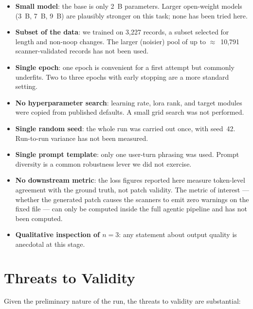 \documentclass[12pt, a4paper]{report}
\begin{document}
\begin{itemize}
  \item \textbf{Small model}: the base is only 2~B parameters. Larger
        open-weight models (3~B, 7~B, 9~B) are plausibly stronger on
        this task; none has been tried here.
  \item \textbf{Subset of the data}: we trained on 3{,}227 records, a
        subset selected for length and non-noop changes. The larger
        (noisier) pool of up to \(\approx\)~10{,}791 scanner-validated
        records has not been used.
  \item \textbf{Single epoch}: one epoch is convenient for a first
        attempt but commonly underfits. Two to three epochs with early
        stopping are a more standard setting.
  \item \textbf{No hyperparameter search}: learning rate, \gls{lora}
        rank, and target modules were copied from published defaults.
        A small grid search was not performed.
  \item \textbf{Single random seed}: the whole run was carried out once,
        with seed~42. Run-to-run variance has not been measured.
  \item \textbf{Single prompt template}: only one user-turn phrasing was
        used. Prompt diversity is a common robustness lever we did not
        exercise.
  \item \textbf{No downstream metric}: the loss figures reported here
        measure token-level agreement with the ground truth, not patch
        validity. The metric of interest --- whether the generated patch
        causes the scanners to emit zero warnings on the fixed file ---
        can only be computed inside the full agentic pipeline and has
        not been computed.
  \item \textbf{Qualitative inspection of \(n=3\)}: any statement about
        output quality is anecdotal at this stage.
\end{itemize}

\section{Threats to Validity}

Given the preliminary nature of the run, the threats to validity are
substantial:
\end{document}
